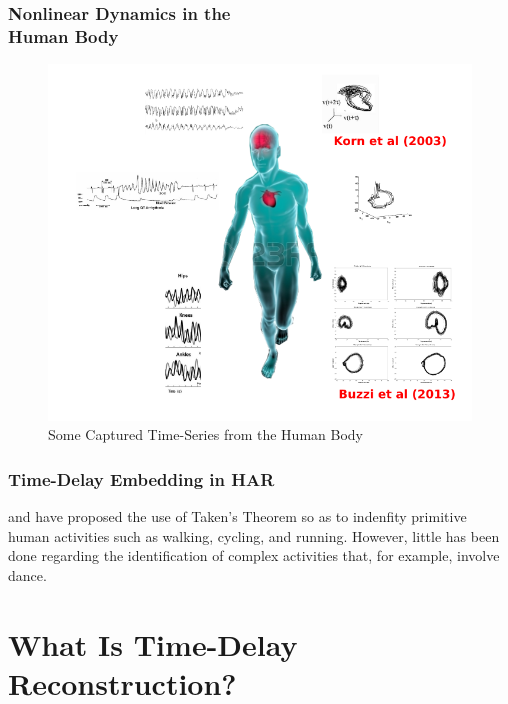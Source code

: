 \documentclass{beamer}
\theoremstyle{definition}
\begin{document}
\begin{frame}
\frametitle{Nonlinear Dynamics in the \\ Human Body}

\begin{figure}
\includegraphics[scale=.3]{timeserieshumanbody}
\centering 
\caption{Some Captured Time-Series from the Human Body}
\end{figure}
\end{frame}


\begin{bibunit}[apalike]
\begin{frame}
\frametitle{Time-Delay Embedding in HAR}

\cite{Jordan2010} and \cite{Sama2013} have proposed the use of 
Taken's Theorem so as to indenfity primitive human activities such as 
walking, cycling, and running. However, little has been done regarding 
the identification of complex activities that, for example, involve dance.

    \vfill
\end{frame}
\end{bibunit}




\section{What Is Time-Delay Reconstruction?}
\end{document}
